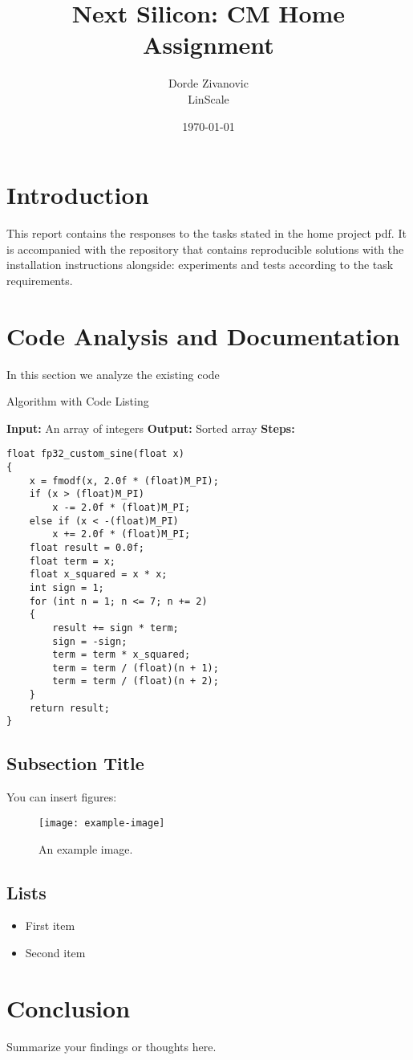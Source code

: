 \documentclass[12pt]{article}
\title{Next Silicon: CM Home Assignment}
\author{Dorde Zivanovic \\ \small{LinScale}}
\date{\today}
\begin{document}
\maketitle
\tableofcontents
\newpage

\section{Introduction}
This report contains the responses to the tasks stated in the home project pdf.
It is accompanied with the repository that contains reproducible solutions with the installation instructions alongside: experiments and tests according to the task requirements.
\section{Code Analysis and Documentation}
In this section we analyze the existing code
\begin{algorithm}
    \caption{Algorithm with Code Listing}
    \begin{algorithmic}[1]
    \State \textbf{Input:} An array of integers
    \State \textbf{Output:} Sorted array
    \State \textbf{Steps:}
    \State
\begin{lstlisting}
float fp32_custom_sine(float x)
{
    x = fmodf(x, 2.0f * (float)M_PI);
    if (x > (float)M_PI)
        x -= 2.0f * (float)M_PI;
    else if (x < -(float)M_PI)
        x += 2.0f * (float)M_PI;
    float result = 0.0f;
    float term = x;
    float x_squared = x * x;
    int sign = 1;
    for (int n = 1; n <= 7; n += 2)
    {
        result += sign * term;
        sign = -sign;
        term = term * x_squared;
        term = term / (float)(n + 1);
        term = term / (float)(n + 2);
    }
    return result;
}
\end{lstlisting}
\end{algorithmic}
\end{algorithm}
\subsection{Subsection Title}
You can insert figures:
\begin{figure}[h!]
    \centering
    \texttt{[image: example-image]}
    \caption{An example image.}
    \label{fig:example}
\end{figure}

\subsection{Lists}
\begin{itemize}
    \item First item
    \item Second item
\end{itemize}

\section{Conclusion}
Summarize your findings or thoughts here.
\cite{apostol1985mathematical}


\end{document}
